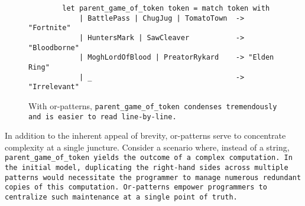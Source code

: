 \documentclass[manuscript,screen,review, 12pt]{acmart}
\begin{document}
    \begin{figure}
    \begin{center}
    \begin{verbatim}
        let parent_game_of_token token = match token with 
            | BattlePass | ChugJug | TomatoTown  -> "Fortnite"
            | HuntersMark | SawCleaver           -> "Bloodborne"
            | MoghLordOfBlood | PreatorRykard    -> "Elden Ring"
            | _                                  -> "Irrelevant"
    \end{verbatim}
    \end{center}    
    \caption{With or-patterns, \tt{parent\_game\_of\_token} condenses
    tremendously and is easier to read line-by-line.} 
    \label{fig:orpgot}
    \end{figure}

    In addition to the inherent appeal of brevity, or-patterns serve to
    concentrate complexity at a single juncture. Consider a scenario where,
    instead of a string, \tt{parent\_game\_of\_token} yields the outcome of a
    complex computation. In the initial model, duplicating the right-hand sides
    across multiple patterns would necessitate the programmer to manage numerous
    redundant copies of this computation. Or-patterns empower programmers to
    centralize such maintenance at a single point of truth.
\end{document}

